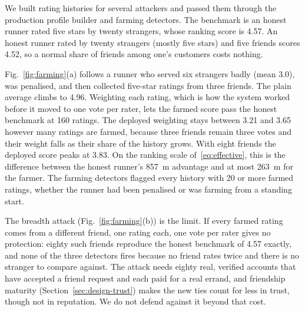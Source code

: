 We built rating histories for several attackers and passed them through the
production profile builder and farming detectors. The benchmark is an honest runner
rated five stars by twenty strangers, whose ranking score is 4.57. An honest runner
rated by twenty strangers (mostly five stars) and five friends scores 4.52, so a
normal share of friends among one's customers costs nothing.

Fig.~\ref{fig:farming}(a) follows a runner who served six strangers badly (mean 3.0),
was penalised, and then collected five-star ratings from three friends. The plain
average climbs to 4.96. Weighting each rating, which is how the system worked before
it moved to one vote per rater, lets the farmed score pass the honest benchmark at
160 ratings. The deployed weighting stays between 3.21 and 3.65 however many ratings
are farmed, because three friends remain three votes and their weight falls as their
share of the history grows. With eight friends the deployed score peaks at 3.83. On
the ranking scale of~\eqref{eq:effective}, this is the difference between the honest
runner's 857~m advantage and at most 263~m for the farmer. The farming detectors
flagged every history with 20 or more farmed ratings, whether the runner had been
penalised or was farming from a standing start.

The breadth attack (Fig.~\ref{fig:farming}(b)) is the limit. If every farmed rating
comes from a different
friend, one rating each, one vote per rater gives no protection: eighty such friends
reproduce the honest benchmark of 4.57 exactly, and none of the three detectors fires
because no friend rates twice and there is no stranger to compare against. The attack
needs eighty real, verified accounts that have accepted a friend request and each paid
for a real errand, and friendship maturity (Section~\ref{sec:design-trust}) makes the
new ties count for less in trust, though not in reputation. We do not defend against
it beyond that cost.

